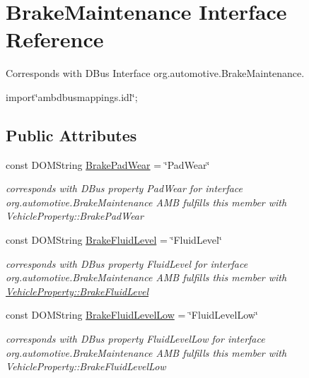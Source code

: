 \hypertarget{interfaceBrakeMaintenance}{\section{Brake\+Maintenance Interface Reference}
\label{interfaceBrakeMaintenance}
}


Corresponds with D\+Bus Interface org.\+automotive.\+Brake\+Maintenance.  




{\ttfamily import\char`\"{}ambdbusmappings.\+idl\char`\"{};}

\subsection*{Public Attributes}
\begin{DoxyCompactItemize}
\item 
\hypertarget{interfaceBrakeMaintenance_a2da7ee50f0528e3e7f1b7317c57a0ea4}{const D\+O\+M\+String \hyperlink{interfaceBrakeMaintenance_a2da7ee50f0528e3e7f1b7317c57a0ea4}{Brake\+Pad\+Wear} = \char`\"{}Pad\+Wear\char`\"{}}\label{interfaceBrakeMaintenance_a2da7ee50f0528e3e7f1b7317c57a0ea4}

\begin{DoxyCompactList}\small\item\em corresponds with D\+Bus property Pad\+Wear for interface org.\+automotive.\+Brake\+Maintenance A\+M\+B fulfills this member with Vehicle\+Property\+::\+Brake\+Pad\+Wear \end{DoxyCompactList}\item 
\hypertarget{interfaceBrakeMaintenance_a84984ddf4ca782a8bf8fd1a64c773aee}{const D\+O\+M\+String \hyperlink{interfaceBrakeMaintenance_a84984ddf4ca782a8bf8fd1a64c773aee}{Brake\+Fluid\+Level} = \char`\"{}Fluid\+Level\char`\"{}}\label{interfaceBrakeMaintenance_a84984ddf4ca782a8bf8fd1a64c773aee}

\begin{DoxyCompactList}\small\item\em corresponds with D\+Bus property Fluid\+Level for interface org.\+automotive.\+Brake\+Maintenance A\+M\+B fulfills this member with \hyperlink{classVehicleProperty_a83bc635222e9ba14dfa134defa21e825}{Vehicle\+Property\+::\+Brake\+Fluid\+Level} \end{DoxyCompactList}\item 
\hypertarget{interfaceBrakeMaintenance_a947300ba92f881da80c38e55c257c68b}{const D\+O\+M\+String \hyperlink{interfaceBrakeMaintenance_a947300ba92f881da80c38e55c257c68b}{Brake\+Fluid\+Level\+Low} = \char`\"{}Fluid\+Level\+Low\char`\"{}}\label{interfaceBrakeMaintenance_a947300ba92f881da80c38e55c257c68b}

\begin{DoxyCompactList}\small\item\em corresponds with D\+Bus property Fluid\+Level\+Low for interface org.\+automotive.\+Brake\+Maintenance A\+M\+B fulfills this member with Vehicle\+Property\+::\+Brake\+Fluid\+Level\+Low \end{DoxyCompactList}\end{DoxyCompactItemize}


